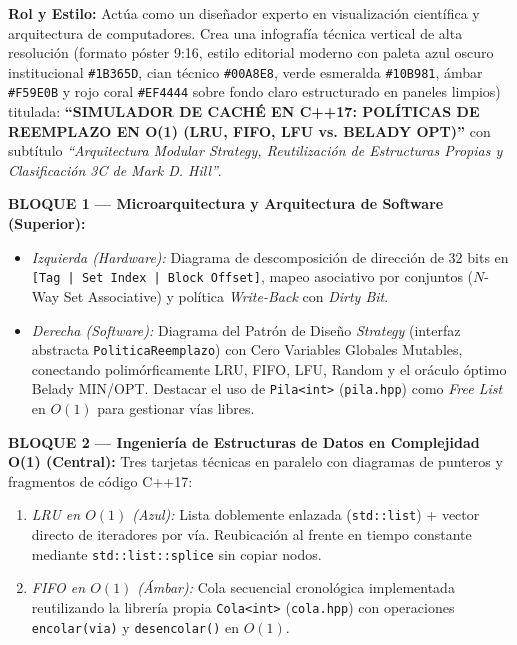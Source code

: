 \documentclass[11pt,letterpaper]{article}
\begin{document}
\begin{tcolorbox}[
    enhanced,
    breakable,
    colback=LightGray,
    colframe=UCBlue,
    arc=2mm,
    boxrule=0.8pt,
    title=\textbf{\color{white}Prompt Maestro Asociado a la Infografía del Proyecto 4},
    fonttitle=\bfseries\small,
    coltitle=white
]
\footnotesize
\textbf{Rol y Estilo:} Actúa como un diseñador experto en visualización científica y arquitectura de computadores. Crea una infografía técnica vertical de alta resolución (formato póster 9:16, estilo editorial moderno con paleta azul oscuro institucional \texttt{\#1B365D}, cian técnico \texttt{\#00A8E8}, verde esmeralda \texttt{\#10B981}, ámbar \texttt{\#F59E0B} y rojo coral \texttt{\#EF4444} sobre fondo claro estructurado en paneles limpios) titulada: \textbf{``SIMULADOR DE CACHÉ EN C++17: POLÍTICAS DE REEMPLAZO EN O(1) (LRU, FIFO, LFU vs. BELADY OPT)''} con subtítulo \textit{``Arquitectura Modular Strategy, Reutilización de Estructuras Propias y Clasificación 3C de Mark D. Hill''}.\par\vspace{0.15cm}
\textbf{BLOQUE 1 — Microarquitectura y Arquitectura de Software (Superior):}
\begin{itemize}
    \item \textit{Izquierda (Hardware):} Diagrama de descomposición de dirección de 32 bits en \texttt{[Tag | Set Index | Block Offset]}, mapeo asociativo por conjuntos ($N$-Way Set Associative) y política \textit{Write-Back} con \textit{Dirty Bit}.
    \item \textit{Derecha (Software):} Diagrama del Patrón de Diseño \textit{Strategy} (interfaz abstracta \texttt{PoliticaReemplazo}) con Cero Variables Globales Mutables, conectando polimórficamente LRU, FIFO, LFU, Random y el oráculo óptimo Belady MIN/OPT. Destacar el uso de \texttt{Pila<int>} (\texttt{pila.hpp}) como \textit{Free List} en $O(1)$ para gestionar vías libres.
\end{itemize}
\textbf{BLOQUE 2 — Ingeniería de Estructuras de Datos en Complejidad O(1) (Central):}
Tres tarjetas técnicas en paralelo con diagramas de punteros y fragmentos de código C++17:
\begin{enumerate}
    \item \textit{LRU en $O(1)$ (Azul):} Lista doblemente enlazada (\texttt{std::list}) + vector directo de iteradores por vía. Reubicación al frente en tiempo constante mediante \texttt{std::list::splice} sin copiar nodos.
    \item \textit{FIFO en $O(1)$ (Ámbar):} Cola secuencial cronológica implementada reutilizando la librería propia \texttt{Cola<int>} (\texttt{cola.hpp}) con operaciones \texttt{encolar(via)} y \texttt{desencolar()} en $O(1)$.

\end{enumerate}
\end{tcolorbox}
\end{document}

